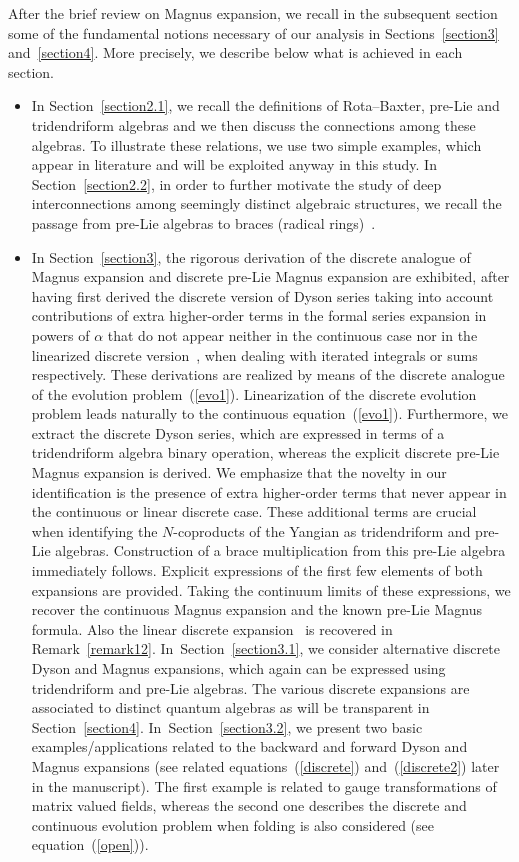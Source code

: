 \documentclass[pdftex]{sigma}
\numberwithin{equation}{section}
\theoremstyle{definition}
\begin{document}
After the brief review on Magnus expansion, we recall in the subsequent section some of the fundamental notions necessary of our analysis in Sections~\ref{section3} and~\ref{section4}. More precisely, we describe below what is achieved in each section.
\begin{itemize}\itemsep=0pt
\item In Section~\ref{section2.1}, we recall the definitions of Rota--Baxter, pre-Lie and tridendriform algebras and we then discuss the connections among these algebras. To illustrate these relations, we use two simple examples, which appear in literature and will be exploited anyway in this study. In Section~\ref{section2.2}, in order to further motivate the study of deep interconnections among seemingly distinct algebraic structures, we recall the passage from pre-Lie algebras to braces (radical rings)~\cite{Rump, Smok1, Smok2}.

 \item In Section~\ref{section3}, the rigorous derivation of the discrete analogue of Magnus expansion and discrete pre-Lie Magnus expansion are exhibited, after having first derived the discrete version of Dyson series taking into account contributions of extra higher-order terms in the formal series expansion in powers of $\alpha$ that do not appear neither in the continuous case nor in the linearized discrete version~\cite{EbraMan}, when dealing with iterated integrals or sums respectively. These derivations are realized by means of the discrete analogue of the evolution problem~(\ref{evo1}). Linearization of the discrete evolution problem leads naturally to the continuous equation~(\ref{evo1}). Furthermore, we extract the discrete Dyson series, which are expressed in terms of a tridendriform algebra binary operation, whereas the explicit discrete pre-Lie Magnus expansion is derived.
 We emphasize that the novelty in our identification is the presence of extra higher-order terms that never appear in the continuous or linear discrete case. These additional terms are crucial when identifying the $N$-coproducts of the Yangian as tridendriform and pre-Lie algebras. Construction of a brace multiplication from this pre-Lie algebra immediately follows. Explicit expressions of the first few elements of both expansions are provided. Taking the continuum limits of these expressions, we recover the continuous Magnus expansion and the known pre-Lie Magnus formula. Also the linear discrete expansion~\cite{EbraMan} is recovered in Remark~\ref{remark12}. In~Section~\ref{section3.1}, we consider alternative discrete Dyson and Magnus expansions, which again can be expressed using tridendriform and pre-Lie algebras. The various discrete expansions are associated to distinct quantum algebras as will be transparent in Section~\ref{section4}. In~Section~\ref{section3.2}, we present two basic examples/applications related to the backward and forward Dyson and Magnus expansions (see related equations~(\ref{discrete}) and~(\ref{discrete2}) later in the manuscript). The first example is related to gauge transformations of matrix valued fields, whereas the second one describes the discrete and continuous evolution problem when folding is also considered (see equation~(\ref{open})).


\end{itemize}
\end{document}
